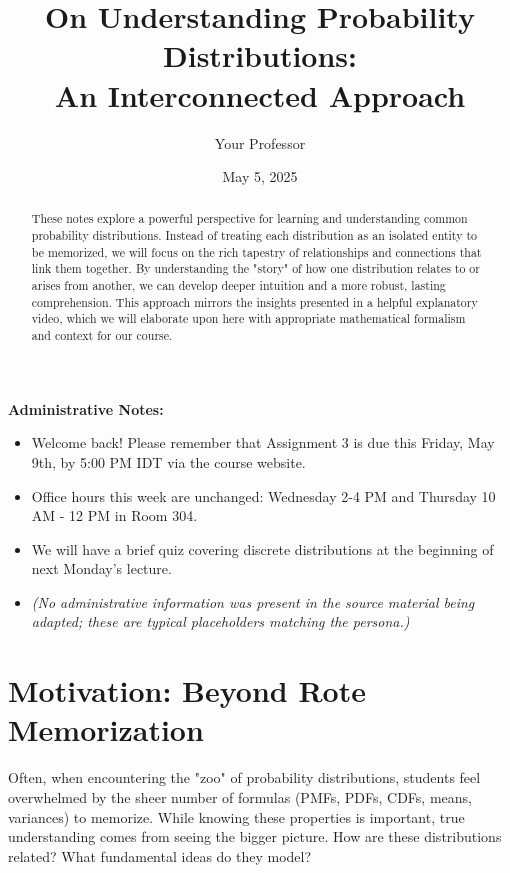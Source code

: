 \documentclass[11pt, letterpaper]{article}
\title{On Understanding Probability Distributions: \\ An Interconnected Approach}
\author{Your Professor} %
\date{May 5, 2025} %
\theoremstyle{definition}
\theoremstyle{remark}
\newenvironment{adminnote}
  {\begin{lrbox}{\adminbox}%
   \begin{minipage}{0.9\textwidth}%
     \textbf{Administrative Notes:}\medskip%
     \begin{itemize}}%
  {\end{itemize}%
   \end{minipage}%
   \end{lrbox}%
   \par\medskip\noindent %
   \begin{center}%
     \fbox{\usebox{\adminbox}}%
   \end{center}\medskip}%
\begin{document}
\maketitle

\begin{abstract}
These notes explore a powerful perspective for learning and understanding common probability distributions. Instead of treating each distribution as an isolated entity to be memorized, we will focus on the rich tapestry of relationships and connections that link them together. By understanding the "story" of how one distribution relates to or arises from another, we can develop deeper intuition and a more robust, lasting comprehension. This approach mirrors the insights presented in a helpful explanatory video, which we will elaborate upon here with appropriate mathematical formalism and context for our course.
\end{abstract}

\begin{adminnote}
    \item Welcome back! Please remember that Assignment 3 is due this Friday, May 9th, by 5:00 PM IDT via the course website.
    \item Office hours this week are unchanged: Wednesday 2-4 PM and Thursday 10 AM - 12 PM in Room 304.
    \item We will have a brief quiz covering discrete distributions at the beginning of next Monday's lecture.
    \item \textit{(No administrative information was present in the source material being adapted; these are typical placeholders matching the persona.)}
\end{adminnote}

\section{Motivation: Beyond Rote Memorization}

Often, when encountering the "zoo" of probability distributions, students feel overwhelmed by the sheer number of formulas (PMFs, PDFs, CDFs, means, variances) to memorize. While knowing these properties is important, true understanding comes from seeing the bigger picture. How are these distributions related? What fundamental ideas do they model?
\end{document}
